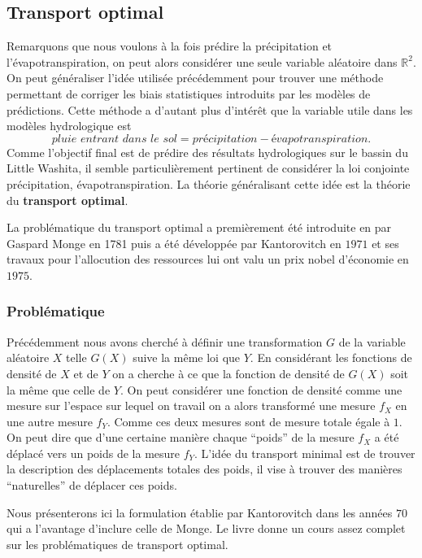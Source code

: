 \documentclass[a4paper,10pt]{article}
\begin{document}
\subsection{Transport optimal}

Remarquons que nous voulons à la fois prédire la précipitation et l'évapotranspiration, on peut alors considérer une seule variable aléatoire dans $\mathbb{R}^2$. On peut généraliser l'idée utilisée précédemment pour trouver une méthode permettant de corriger les biais statistiques introduits par les modèles de prédictions. Cette méthode a d'autant plus d'intérêt que la variable utile dans les modèles hydrologique est 
\[\textit{pluie entrant dans le sol}=\textit{précipitation}-\textit{évapotranspiration}.\]
Comme l'objectif final est de prédire des résultats hydrologiques sur le bassin du Little Washita, il semble particulièrement pertinent de considérer la loi conjointe précipitation, évapotranspiration. La théorie généralisant cette idée est la théorie du \textbf{transport optimal}.

La problématique du transport optimal a premièrement été introduite en par Gaspard Monge en 1781 puis a été développée par Kantorovitch en $1971$ et ses travaux pour l'allocution des ressources lui ont valu un prix nobel d'économie en $1975$.

\subsubsection{Problématique}

Précédemment nous avons cherché à définir une transformation $G$ de la variable aléatoire $X$ telle $G(X)$ suive la même loi que $Y$. En considérant les fonctions de densité de $X$ et de $Y$ on a cherche à ce que la fonction de densité de $G(X)$ soit la même que celle de $Y$. On peut considérer une fonction de densité comme une mesure sur l'espace sur lequel on travail on a alors transformé une mesure $f_X$ en une autre mesure $f_Y$. Comme ces deux mesures sont de mesure totale égale à $1$. On peut dire que d'une certaine manière chaque ``poids'' de la mesure $f_X$ a été déplacé vers un poids de la mesure $f_Y$. L'idée du transport minimal est de trouver la description des déplacements totales des poids, il vise à trouver des manières ``naturelles'' de déplacer ces poids.  

Nous présenterons ici la formulation établie par Kantorovitch dans les années $70$ qui a l'avantage d'inclure celle de Monge. Le livre \cite{villani2003topics} donne un cours assez complet sur les problématiques de transport optimal. 
\end{document}
